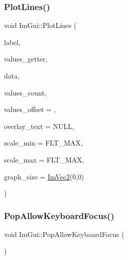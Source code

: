 \hypertarget{namespace_im_gui_a94a2645d45c96da35b834dc7db93a9f1}{}\label{namespace_im_gui_a94a2645d45c96da35b834dc7db93a9f1} 
\subsubsection{\texorpdfstring{Plot\+Lines()}{PlotLines()}\hspace{0.1cm}{\footnotesize\ttfamily [2/2]}}
{\footnotesize\ttfamily void Im\+Gui\+::\+Plot\+Lines (\begin{DoxyParamCaption}\item[{const char $\ast$}]{label,  }\item[{float($\ast$)(void $\ast$data, int idx)}]{values\+\_\+getter,  }\item[{void $\ast$}]{data,  }\item[{int}]{values\+\_\+count,  }\item[{int}]{values\+\_\+offset = {},  }\item[{const char $\ast$}]{overlay\+\_\+text = {\ttfamily NULL},  }\item[{float}]{scale\+\_\+min = {\ttfamily FLT\+\_\+MAX},  }\item[{float}]{scale\+\_\+max = {\ttfamily FLT\+\_\+MAX},  }\item[{\hyperlink{struct_im_vec2}{Im\+Vec2}}]{graph\+\_\+size = {\ttfamily \hyperlink{struct_im_vec2}{Im\+Vec2}(0,0)} }\end{DoxyParamCaption})}

\hypertarget{namespace_im_gui_a017db69016de97685aec978e504dc96d}{}\label{namespace_im_gui_a017db69016de97685aec978e504dc96d} 
\subsubsection{\texorpdfstring{Pop\+Allow\+Keyboard\+Focus()}{PopAllowKeyboardFocus()}}
{\footnotesize\ttfamily void Im\+Gui\+::\+Pop\+Allow\+Keyboard\+Focus (\begin{DoxyParamCaption}{ }\end{DoxyParamCaption})}

\hypertarget{namespace_im_gui_a0f883e8507be797ca8ba1448d2b9dbb0}{}\label{namespace_im_gui_a0f883e8507be797ca8ba1448d2b9dbb0} 

